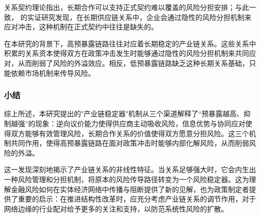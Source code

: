 关系契约理论指出，长期合作可以支持正式契约难以覆盖的风险分担安排；与此一致，\citet{macchiavello2015relational} 的实证研究发现，在长期供应链关系中，企业会通过隐性的风险分担机制来应对冲击，这种机制在正式契约中往往是缺失的。

在本研究的背景下，高预暴露链路往往对应着长期稳定的产业链关系。这些关系中积累的关系资本使得双方在政策冲击发生时能够通过隐性的风险分担机制来共同应对，从而削弱了风险的外溢效应。相反，低预暴露链路缺乏这种长期关系基础，只能依赖市场机制来传导风险。

\subsubsection*{小结}

综上所述，本研究提出的"产业链稳定器"机制从三个渠道解释了“预暴露越高、抑制越强”的现象：逆向议价能力使得供应商主动吸收风险，信息优势与协同应对使得双方能够有效管理风险，长期合作关系的价值使得双方愿意分担风险。这三个机制共同作用，使得高预暴露链路在面对政策冲击时能够内部化解风险，从而削弱风险的外溢。

这一发现深刻地揭示了产业链关系的非线性特征。当关系足够强大时，它会内生出一种风险管理和分担机制，将原本的风险传导路径转变为一个风险稳定器。这为理解金融风险如何在实体经济网络中传播与阻断提供了新的见解，也为政策制定者提供了重要的启示：在推进结构性改革时，应充分考虑产业链关系的调节作用，对于网络边缘的行业配对给予更多的关注和支持，以防范系统性风险的扩散。

